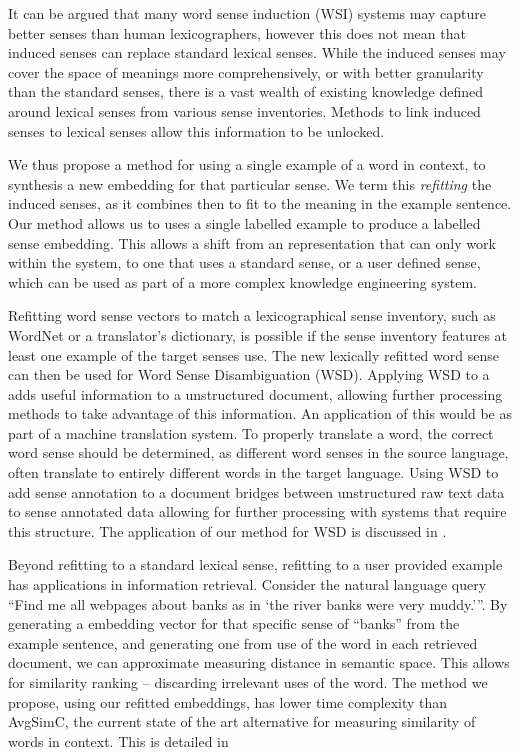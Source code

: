 \documentclass{sig-alternate}
\begin{document}
It can be argued that many word sense induction (WSI) systems may capture better senses than human lexicographers, however this does not mean that induced senses can replace standard lexical senses. While the induced senses may cover the space of meanings more comprehensively, or with better granularity than the standard senses, there is a vast wealth of existing knowledge defined around lexical senses from various sense inventories. Methods to link induced senses to lexical senses allow this information to be unlocked.


We thus propose a method for using a single example of a word in context, to synthesis a new embedding for that particular sense. We term this \emph{refitting} the induced senses, as it combines then to fit to the meaning in the example sentence. Our method allows us to uses a single labelled example to produce a labelled sense embedding. This allows a shift from an representation that can only work within the system, to one that uses a standard sense, or a user defined sense, which can be used as part of a more complex knowledge engineering system. 

Refitting word sense vectors to match a lexicographical sense inventory, such as WordNet or a translator's dictionary, is possible if the sense inventory features at least one example of the target senses use. The new lexically refitted word sense can then be used for Word Sense Disambiguation (WSD). Applying WSD to a adds useful information to a unstructured document, allowing further processing methods to take advantage of this information. An application of this would be as part of a machine translation system. To properly translate a word, the correct word sense should be determined, as different word senses in the source language, often translate to entirely different words in the target language. Using WSD to add sense annotation to a document bridges between unstructured raw text data to sense annotated data allowing for further processing with systems that require this structure. The application of our method for WSD is discussed in .

Beyond refitting to a standard lexical sense, refitting to a user provided example has applications in information retrieval. Consider the natural language query \enquote{Find me all webpages about banks as in \enquote{the river banks were very muddy.}}. By generating a embedding vector for that specific sense of ``banks'' from the example sentence, and generating one from use of the word in each retrieved document, we can approximate measuring distance in semantic space. This allows for similarity ranking -- discarding irrelevant uses of the word. The method we propose, using our refitted embeddings, has lower time complexity than AvgSimC, the current state of the art alternative for measuring similarity of words in context. This is detailed in 
\end{document}
